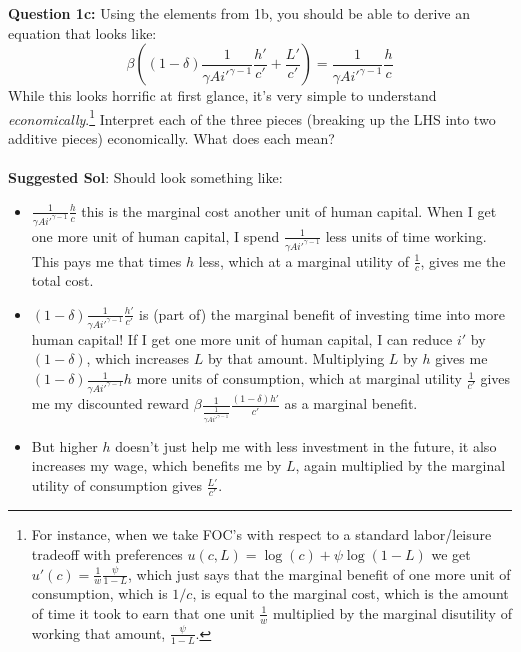 \documentclass[11pt]{article}
\begin{document}
\textbf{Question 1c:} Using the elements from 1b, you should be able to derive an equation that looks like: $$\beta \left((1-\delta)\frac{1}{\gamma A i'^{\gamma-1}}\frac{h'}{c'}+\frac{L'}{c'}\right)=\frac{1}{\gamma A i'^{\gamma-1}}\frac{h}{c}$$
While this looks horrific at first glance, it's very simple to understand \emph{economically}.\footnote{For instance, when we take FOC's with respect to a standard labor/leisure tradeoff with preferences $u(c,L)=\log(c)+\psi\log(1-L)$ we get $u'(c)=\frac{1}{w}\frac{\psi}{1-L}$, which just says that the marginal benefit of one more unit of consumption, which is $1/c$, is equal to the marginal cost, which is the amount of time it took to earn that one unit $\frac{1}{w}$ multiplied by the marginal disutility of working that amount, $\frac{\psi}{1-L}$.}  Interpret each of the three pieces (breaking up the LHS into two additive pieces) economically. What does each mean?\\
 \ \\
\textbf{Suggested Sol}: Should look something like:\\
\begin{itemize}
\item $\frac{1}{\gamma A i'^{\gamma-1}}\frac{h}{c}$ this is the marginal cost another unit of human capital.  When I get one more unit of human capital, I spend $\frac{1}{\gamma A i'^{\gamma-1}}$ less units of time working.  This pays me that times $h$ less, which at a marginal utility of $\frac{1}{c}$, gives me the total cost.
\item $(1-\delta)\frac{1}{\gamma A i'^{\gamma-1}}\frac{h'}{c'}$ is (part of) the marginal benefit of investing time into more human capital!  If I get one more unit of human capital, I can reduce $i'$ by $(1-\delta)$, which increases $L$ by that amount.  Multiplying $L$ by $h$ gives me $(1-\delta)\frac{1}{\gamma A i'^{\gamma-1}}h$ more units of consumption, which at marginal utility $\frac{1}{c'}$ gives me my discounted reward $\beta\frac{1}{\frac{1}{\gamma A i'^{\gamma-1}}}\frac{(1-\delta)h'}{c'}$ as a marginal benefit.
\item But higher $h$ doesn't just help me with less investment in the future, it also increases my wage, which benefits me by $L$, again multiplied by the marginal utility of consumption gives $\frac{L'}{c'}$.
\end{itemize}

\clearpage
\end{document}
